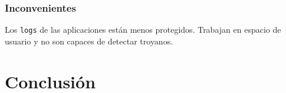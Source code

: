 \documentclass[12pt]{article}
\begin{document}
            \subsubsection{Inconvenientes}
                Los \texttt{logs} de las aplicaciones están menos protegidos. Trabajan en espacio de usuario y no son capaces de detectar troyanos.

    \section{Conclusión}

    \newpage
    \nocite{*}
    
    {}
\end{document}
